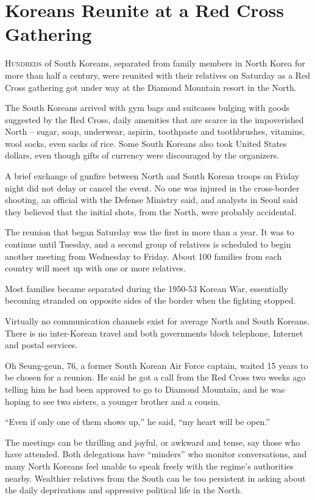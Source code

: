 ﻿\documentclass[12pt]{article}
\begin{document}
\section{Koreans Reunite at a Red Cross Gathering}

\lettrine{H}{undreds} of South Koreans, separated from family members in
North Korea for more than half a century, were reunited with their relatives on Saturday as a Red
Cross gathering got under way at the Diamond Mountain resort in the North.

The South Koreans arrived with gym bags and suitcases bulging with goods suggested by the Red Cross,
daily amenities that are scarce in the impoverished North -- sugar, soap, underwear, aspirin,
toothpaste and toothbrushes, vitamins, wool socks, even sacks of rice. Some South Koreans also took
United States dollars, even though gifts of currency were discouraged by the organizers.

A brief exchange of gunfire between North and South Korean troops on Friday night did not delay or
cancel the event. No one was injured in the cross-border shooting, an official with the Defense
Ministry said, and analysts in Seoul said they believed that the initial shots, from the North, were
probably accidental.

The reunion that began Saturday was the first in more than a year. It was to continue until Tuesday,
and a second group of relatives is scheduled to begin another meeting from Wednesday to Friday.
About 100 families from each country will meet up with one or more relatives.

Most families became separated during the 1950-53 Korean War, essentially becoming stranded on
opposite sides of the border when the fighting stopped.

Virtually no communication channels exist for average North and South Koreans. There is no
inter-Korean travel and both governments block telephone, Internet and postal services.

Oh Seung-geun, 76, a former South Korean Air Force captain, waited 15 years to be chosen for a
reunion. He said he got a call from the Red Cross two weeks ago telling him he had been approved to
go to Diamond Mountain, and he was hoping to see two sisters, a younger brother and a cousin.

``Even if only one of them shows up,'' he said, ``my heart will be open.''

The meetings can be thrilling and joyful, or awkward and tense, say those who have attended. Both
delegations have ``minders'' who monitor conversations, and many North Koreans feel unable to speak
freely with the regime's authorities nearby. Wealthier relatives from the South can be too
persistent in asking about the daily deprivations and oppressive political life in the North.
\end{document}
